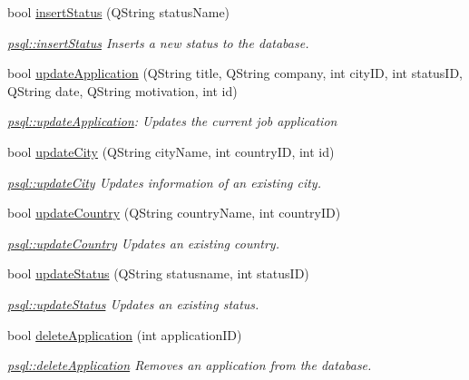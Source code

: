 \begin{DoxyCompactItemize}
bool \hyperlink{classpsql_a601ee0bdc9430b1d674a857f7c94b767}{insert\+Status} (Q\+String status\+Name)
\begin{DoxyCompactList}\small\item\em \hyperlink{classpsql_a601ee0bdc9430b1d674a857f7c94b767}{psql\+::insert\+Status} Inserts a new status to the database. \end{DoxyCompactList}\item 
bool \hyperlink{classpsql_a836eea3c6deb2d6a3a357193a99d6ee7}{update\+Application} (Q\+String title, Q\+String company, int city\+ID, int status\+ID, Q\+String date, Q\+String motivation, int id)
\begin{DoxyCompactList}\small\item\em \hyperlink{classpsql_a836eea3c6deb2d6a3a357193a99d6ee7}{psql\+::update\+Application}\+: Updates the current job application \end{DoxyCompactList}\item 
bool \hyperlink{classpsql_a6adf2ba381783e520c03fe5324dcb010}{update\+City} (Q\+String city\+Name, int country\+ID, int id)
\begin{DoxyCompactList}\small\item\em \hyperlink{classpsql_a6adf2ba381783e520c03fe5324dcb010}{psql\+::update\+City} Updates information of an existing city. \end{DoxyCompactList}\item 
bool \hyperlink{classpsql_ae662278c5fb8ff3471ee1442e69482e2}{update\+Country} (Q\+String country\+Name, int country\+ID)
\begin{DoxyCompactList}\small\item\em \hyperlink{classpsql_ae662278c5fb8ff3471ee1442e69482e2}{psql\+::update\+Country} Updates an existing country. \end{DoxyCompactList}\item 
bool \hyperlink{classpsql_a620364c99c98e20720908deb045536a0}{update\+Status} (Q\+String statusname, int status\+ID)
\begin{DoxyCompactList}\small\item\em \hyperlink{classpsql_a620364c99c98e20720908deb045536a0}{psql\+::update\+Status} Updates an existing status. \end{DoxyCompactList}\item 
bool \hyperlink{classpsql_a999ee8e2d813892411ef502ebc055a79}{delete\+Application} (int application\+ID)
\begin{DoxyCompactList}\small\item\em \hyperlink{classpsql_a999ee8e2d813892411ef502ebc055a79}{psql\+::delete\+Application} Removes an application from the database. \end{DoxyCompactList}\item 

\end{DoxyCompactItemize}
